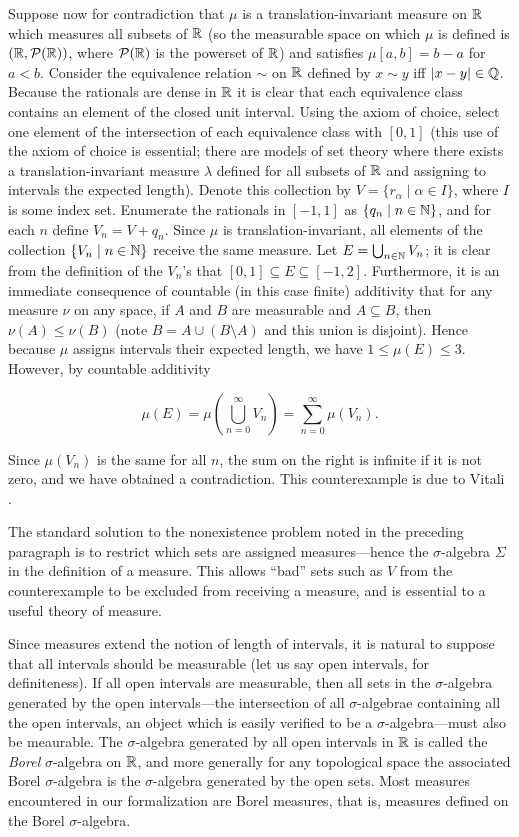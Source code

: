 \documentclass[leqno]{article}
\theoremstyle{definition}
\newcommand{\bldset}[2]{\{{#1}\mid{#2}\}}
\begin{document}
Suppose now for contradiction that $\mu$ is a translation-invariant measure on $\mathbb{R}$ which measures all subsets of $\mathbb{R}$ (so the measurable space on which $\mu$ is defined is $(\mathbb{R}, \mathcal P(\mathbb{R}))$, where $\mathcal P(\mathbb{R})$ is the powerset of $\mathbb{R}$) and satisfies $\mu [a,b] = b - a$ for $a < b$. Consider the equivalence relation $\sim$ on $\mathbb{R}$ defined by $x \sim y$ iff $|x - y| \in \mathbb{Q}$. Because the rationals are dense in $\mathbb{R}$ it is clear that each equivalence class contains an element of the closed unit interval. Using the axiom of choice, select one element of the intersection of each equivalence class with $[0,1]$ (this use of the axiom of choice is essential; there are models of set theory where there exists a translation-invariant measure $\lambda$ defined for all subsets of $\mathbb{R}$ and assigning to intervals the expected length). Denote this collection by $V = \bldset{r_\alpha}{\alpha \in I}$, where $I$ is some index set. Enumerate the rationals in $[-1,1]$ as $\bldset{q_n}{n \in \N}$, and for each $n$ define $V_n = V + q_n$. Since $\mu$ is translation-invariant, all elements of the collection $\bldset{V_n}{n \in \N}$ receive the same measure. Let $E = \bigcup_{n \in \mathbb{N}} V_n$; it is clear from the definition of the $V_n$'s that $[0,1] \subseteq E \subseteq [-1,2]$. Furthermore, it is an immediate consequence of countable (in this case finite) additivity that for any measure $\nu$ on any space, if $A$ and $B$ are measurable and $A \subseteq B$, then $\nu(A) \le \nu(B)$ (note $B = A \cup (B \setminus A)$ and this union is disjoint). Hence because $\mu$ assigns intervals their expected length, we have $1 \le \mu(E) \le 3$. However, by countable additivity

\[ \mu(E) = \mu\left(\bigcup_{n=0}^\infty V_n\right) = \sum_{n=0}^\infty \mu(V_n). \]

Since $\mu(V_n)$ is the same for all $n$, the sum on the right is infinite if it is not zero, and we have obtained a contradiction. This counterexample is due to Vitali \cite{vitali}.

The standard solution to the nonexistence problem noted in the preceding paragraph is to restrict which sets are assigned measures---hence the $\sigma$-algebra $\Sigma$ in the definition of a measure. This allows ``bad'' sets such as $V$ from the counterexample to be excluded from receiving a measure, and is essential to a useful theory of measure.

Since measures extend the notion of length of intervals, it is natural to suppose that all intervals should be measurable (let us say open intervals, for definiteness). If all open intervals are measurable, then all sets in the $\sigma$-algebra generated by the open intervals---the intersection of all $\sigma$-algebrae containing all the open intervals, an object which is easily verified to be a $\sigma$-algebra---must also be meaurable. The $\sigma$-algebra generated by all open intervals in $\mathbb{R}$ is called the {\em Borel} $\sigma$-algebra on $\mathbb{R}$, and more generally for any topological space the associated Borel $\sigma$-algebra is the $\sigma$-algebra generated by the open sets. Most measures encountered in our formalization are Borel measures, that is, measures defined on the Borel $\sigma$-algebra.
\end{document}
